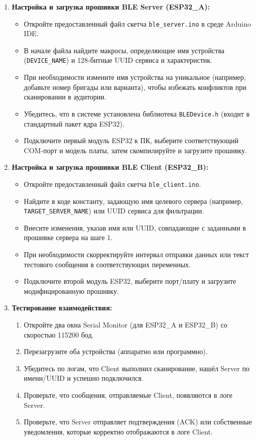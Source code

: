 \begin{enumerate}[nosep, leftmargin=*]
    \item \textbf{Настройка и загрузка прошивки BLE Server (ESP32\_A):}
    \begin{itemize}
        \item Откройте предоставленный файл скетча \texttt{ble\_server.ino} в среде Arduino IDE.
        \item В начале файла найдите макросы, определяющие имя устройства (\texttt{DEVICE\_NAME}) и 128-битные UUID сервиса и характеристик.
        \item При необходимости измените имя устройства на уникальное (например, добавьте номер бригады или варианта), чтобы избежать конфликтов при сканировании в аудитории.
        \item Убедитесь, что в системе установлена библиотека \texttt{BLEDevice.h} (входит в стандартный пакет ядра ESP32).
        \item Подключите первый модуль ESP32 к ПК, выберите соответствующий COM-порт и модель платы, затем скомпилируйте и загрузите прошивку.
    \end{itemize}

    \item \textbf{Настройка и загрузка прошивки BLE Client (ESP32\_B):}
    \begin{itemize}
        \item Откройте предоставленный файл скетча \texttt{ble\_client.ino}.
        \item Найдите в коде константу, задающую имя целевого сервера (например, \texttt{TARGET\_\allowbreak SERVER\_NAME}) или UUID сервиса для фильтрации.
        \item Внесите изменения, указав имя или UUID, совпадающие с заданными в прошивке сервера на шаге 1.
        \item При необходимости скорректируйте интервал отправки данных или текст тестового сообщения в соответствующих переменных.
        \item Подключите второй модуль ESP32, выберите порт/плату и загрузите модифицированную прошивку.
    \end{itemize}

    \item \textbf{Тестирование взаимодействия:}
    \begin{enumerate}[label=\alph*), nosep]
        \item Откройте два окна Serial Monitor (для ESP32\_A и ESP32\_B) со скоростью 115200 бод.
        \item Перезагрузите оба устройства (аппаратно или программно).
        \item Убедитесь по логам, что Client выполнил сканирование, нашёл Server по имени/UUID и успешно подключился.
        \item Проверьте, что сообщения, отправляемые Client, появляются в логе Server.
        \item Проверьте, что Server отправляет подтверждения (ACK) или собственные уведомления, которые корректно отображаются в логе Client.
    \end{enumerate}


\end{enumerate}
